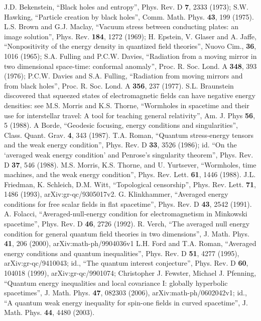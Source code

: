 \documentclass{article}
\begin{document}
\begin{thebibliography}{99}
J.D. Bekenstein, ``Black holes and entropy'', Phys. Rev. D \textbf{7}, 2333 (1973); S.W. Hawking, ``Particle creation by black holes'', Comm. Math. Phys. \textbf{43}, 199 (1975).
L.S. Brown and G.J. Maclay, ``Vacuum stress between conducting plates: an image solution'', Phys. Rev. \textbf{184}, 1272 (1969); 
H. Epstein, V. Glaser and A. Jaffe, ``Nonpositivity of the energy density in quantized field theories'', Nuovo Cim., \textbf{36}, 1016 (1965); S.A. Fulling and P.C.W. Davies, ``Radiation from a moving mirror in two dimensional space-time: conformal anomaly'', Proc. R. Soc. Lond. A \textbf{348}, 393 (1976); P.C.W. Davies and S.A. Fulling, ``Radiation from moving mirrors and from black holes'', Proc. R. Soc. Lond. A \textbf{356}, 237 (1977).  S.L. Braunstein discovered that squeezed states of electromagnetic fields can have negative energy densities: see M.S. Morris and K.S. Thorne, ``Wormholes in spacetime and their use for interstellar travel: A tool for teaching general relativity'', Am. J. Phys \textbf{56}, 5 (1988).
A Borde, ``Geodesic focusing, energy conditions and singularities'', Class. Quant. Grav. \textbf{4}, 343 (1987).
 T.A. Roman, ``Quantum stress-energy tensors and the weak energy condition'', Phys. Rev. D \textbf{33}, 3526 (1986); id. ``On the `averaged weak energy condition' and Penrose's singularity theorem'', Phys. Rev. D \textbf{37}, 546 (1988).
M.S. Morris, K.S. Thorne, and U. Yurtsever, ``Wormholes, time machines, and the weak energy condition'', Phys. Rev. Lett. \textbf{61}, 1446 (1988).
J.L. Friedman, K. Schleich, D.M. Witt, ``Topological censorship'', Phys. Rev. Lett. \textbf{71}, 1486 (1993), arXiv:gr-qc/9305017v2.
G. Klinkhammer, ``Averaged energy conditions for free scalar fields in flat spacetime'', Phys. Rev. D \textbf{43}, 2542 (1991).
A. Folacci, ``Averaged-null-energy condition for electromagnetism in Min\-kow\-ski spacetime'', Phys. Rev. D \textbf{46}, 2726 (1992).
R. Verch, ``The averaged null energy condition for general quantum field theories in two dimensions'', J. Math. Phys. \textbf{41}, 206 (2000), arXiv:math-ph/9904036v1
L.H. Ford and T.A. Roman, ``Averaged energy conditions and quantum inequalities'', Phys. Rev. D \textbf{51}, 4277 (1995), arXiv:gr-qc/9410043; id., ``The quantum interest conjecture'', Phys. Rev. D \textbf{60}, 104018 (1999), arXiv:gr-qc/9901074;  Christopher J. Fewster, Michael J. Pfenning, ``Quantum energy inequalities and local covariance I: globally hyperbolic spacetimes'', J. Math. Phys. \textbf{47}, 082303 (2006), arXiv:math-ph/0602042v1; id., ``A quantum weak energy inequality for spin-one fields in curved spacetime'', J. Math. Phys. \textbf{44}, 4480 (2003).

\end{thebibliography}
\end{document}
